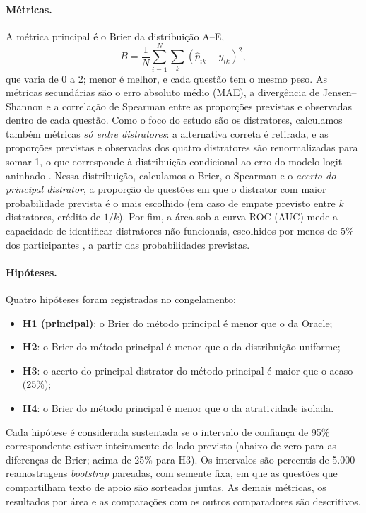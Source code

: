 \paragraph{Métricas.} A métrica principal é o Brier da distribuição A--E,
\begin{equation}
B = \frac{1}{N} \sum_{i=1}^{N} \sum_{k} \left(\hat{p}_{ik} - y_{ik}\right)^2,
\end{equation}
que varia de 0 a 2; menor é melhor, e cada questão tem o mesmo peso. As métricas secundárias são o erro absoluto médio (MAE), a divergência de Jensen--Shannon e a correlação de Spearman entre as proporções previstas e observadas dentro de cada questão. Como o foco do estudo são os distratores, calculamos também métricas \emph{só entre distratores}: a alternativa correta é retirada, e as proporções previstas e observadas dos quatro distratores são renormalizadas para somar 1, o que corresponde à distribuição condicional ao erro do modelo logit aninhado \citep{bolt2012}. Nessa distribuição, calculamos o Brier, o Spearman e o \emph{acerto do principal distrator}, a proporção de questões em que o distrator com maior probabilidade prevista é o mais escolhido (em caso de empate previsto entre $k$ distratores, crédito de $1/k$). Por fim, a área sob a curva ROC (AUC) mede a capacidade de identificar distratores não funcionais, escolhidos por menos de 5\% dos participantes \citep{haladyna1993,tarrant2009}, a partir das probabilidades previstas.

\paragraph{Hipóteses.} Quatro hipóteses foram registradas no congelamento:
\begin{itemize}[nosep]
  \item \textbf{H1 (principal)}: o Brier do método principal é menor que o da Oracle;
  \item \textbf{H2}: o Brier do método principal é menor que o da distribuição uniforme;
  \item \textbf{H3}: o acerto do principal distrator do método principal é maior que o acaso (25\%);
  \item \textbf{H4}: o Brier do método principal é menor que o da atratividade isolada.
\end{itemize}
Cada hipótese é considerada sustentada se o intervalo de confiança de 95\% correspondente estiver inteiramente do lado previsto (abaixo de zero para as diferenças de Brier; acima de 25\% para H3). Os intervalos são percentis de 5.000 reamostragens \textit{bootstrap} pareadas, com semente fixa, em que as questões que compartilham texto de apoio são sorteadas juntas. As demais métricas, os resultados por área e as comparações com os outros comparadores são descritivos.

